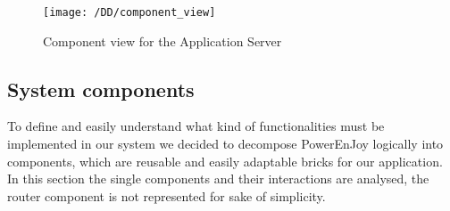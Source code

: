 \begin{figure}[!ht]
    \centering
    \vspace{0.2cm}
    \texttt{[image: /DD/component\_view]}\\
    \vspace{0.4cm}
    \caption{Component view for the Application Server} 
    \label{fig:component_view} 
\end{figure}

\subsection{System components}
To define and easily understand what kind of functionalities must be implemented in our system we decided to decompose PowerEnJoy logically into components, which are reusable and easily adaptable bricks for our application. 
\\In this section the single components and their interactions are analysed, the router component is not represented for sake of simplicity. 

